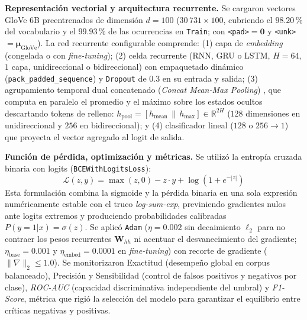 \documentclass[letterpaper, 10 pt, conference]{ieeeconf}
\makeatletter
\def\section{\@startsection{section}{1}{\z@}{0.75ex plus 0.2ex minus 0.1ex}{0.20ex plus 0.10ex minus 0ex}{\normalfont\normalsize\centering\scshape}}
\makeatother
\begin{document}
\textbf{Representación vectorial y arquitectura recurrente.} 
Se cargaron vectores GloVe 6B preentrenados \cite{c4} de dimensión $d = 100$ ($30\,731 \times 100$, cubriendo el $98.20\,\%$ del vocabulario y el $99.93\,\%$ de las ocurrencias en \texttt{Train}; con \texttt{<pad>}$=\mathbf{0}$ y \texttt{<unk>}$=\boldsymbol{\mu}_{\text{GloVe}}$). La red recurrente configurable comprende: (1) capa de \textit{embedding} (congelada o con \textit{fine-tuning}); (2) celda recurrente (RNN, GRU o LSTM, $H = 64$, $1$ capa, unidireccional o bidireccional) con empaquetado dinámico (\texttt{pack\_padded\_sequence}) y \texttt{Dropout} de $0.3$ en su entrada y salida; (3) agrupamiento temporal dual concatenado (\textit{Concat Mean-Max Pooling}) \cite{c5}, que computa en paralelo el promedio y el máximo sobre los estados ocultos descartando tokens de relleno: $h_{\text{pool}} = [h_{\text{mean}} \,\|\, h_{\text{max}}] \in \mathbb{R}^{2H}$ ($128$ dimensiones en unidireccional y $256$ en bidireccional); y (4) clasificador lineal ($128\text{ o }256 \to 1$) que proyecta el vector agregado al logit de salida.

\textbf{Función de pérdida, optimización y métricas.}
Se utilizó la entropía cruzada binaria con logits (\texttt{BCEWithLogitsLoss}):
\begin{equation}
\mathcal{L}(z, y) = \max(z, 0) - z \cdot y + \log\left(1 + e^{-|z|}\right)
\label{eq:bce}
\end{equation}
Esta formulación combina la sigmoide y la pérdida binaria en una sola expresión numéricamente estable con el truco \textit{log-sum-exp}, previniendo gradientes nulos ante logits extremos y produciendo probabilidades calibradas $P(y=1|x) = \sigma(z)$. Se aplicó \texttt{Adam} ($\eta = 0.002$ sin decaimiento $\ell_2$ para no contraer los pesos recurrentes $\mathbf{W}_{hh}$ ni acentuar el desvanecimiento del gradiente; $\eta_{\text{base}} = 0.001$ y $\eta_{\text{embed}} = 0.0001$ en \textit{fine-tuning}) con recorte de gradiente ($\|\nabla\|_2 \le 1.0$). Se monitorizaron Exactitud (desempeño global en corpus balanceado), Precisión y Sensibilidad (control de falsos positivos y negativos por clase), \textit{ROC-AUC} (capacidad discriminativa independiente del umbral) y \textit{F1-Score}, métrica que rigió la selección del modelo para garantizar el equilibrio entre críticas negativas y positivas.

\section{Resultados}
\end{document}
